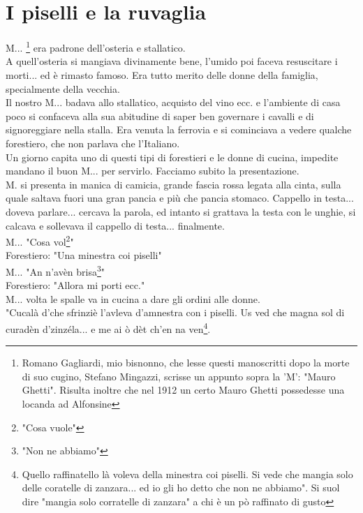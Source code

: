 \documentclass[10pt]{memoir} %
\begin{document}
\chapter{I piselli e la ruvaglia}
M.\:.\:. \footnote{Romano Gagliardi, mio bisnonno, che lesse questi manoscritti dopo la morte di suo cugino, Stefano Mingazzi, scrisse un appunto sopra la 'M': "Mauro Ghetti". Risulta inoltre che nel 1912 un certo Mauro Ghetti possedesse una locanda ad Alfonsine} era padrone dell'osteria e stallatico.\\
A quell'osteria si mangiava divinamente bene, l'umido poi faceva resuscitare i morti... ed è rimasto famoso. Era tutto merito delle donne della famiglia, specialmente della vecchia.\\
Il nostro M.\:.\:. badava allo stallatico, acquisto del vino ecc. e l'ambiente di casa poco si confaceva alla sua abitudine di saper ben governare i cavalli e di signoreggiare nella stalla. Era venuta la ferrovia e si cominciava a vedere qualche forestiero, che non parlava che l'Italiano.\\
Un giorno capita uno di questi tipi di forestieri e le donne di cucina, impedite mandano il buon M.\:.\:. per servirlo. Facciamo subito la presentazione.\\
M. \:\: si presenta in manica di camicia, grande fascia rossa legata alla cinta, sulla quale saltava fuori una gran pancia e più che pancia stomaco. Cappello in testa... doveva parlare... cercava la parola, ed intanto si grattava la testa con le unghie, si calcava e sollevava il cappello di testa... finalmente. \\
M.\:.\:. "Cosa vol\footnote{"Cosa vuole"}"\\
Forestiero: "Una minestra coi piselli"\\
M.\:.\:. "An n'avèn brisa\footnote{"Non ne abbiamo"}"\\
Forestiero: "Allora mi porti ecc."\\
M.\:.\:. volta le spalle va in cucina a dare gli ordini alle donne. \\
"Cucalà d'che sfrinziè l'avleva d'amnestra con i piselli. Us ved che magna sol di curadèn d'zinzéla... e me ai ò dèt ch'en na ven\footnote{Quello raffinatello là voleva della minestra coi piselli. Si vede che mangia solo delle coratelle di zanzara... ed io gli ho detto che non ne abbiamo". Si suol dire "mangia solo corratelle di zanzara" a chi è un pò raffinato di gusto}. \\
\end{document}
